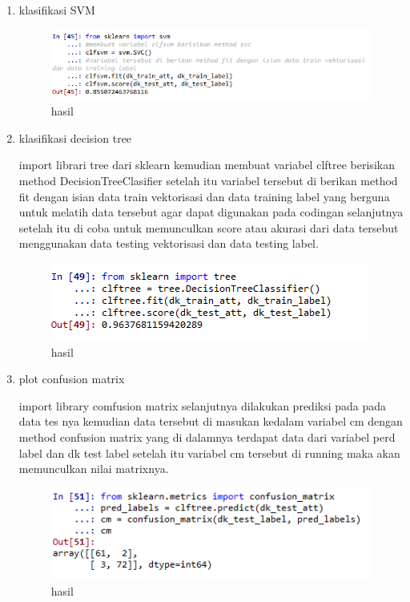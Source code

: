 \begin{enumerate}
\item klasifikasi SVM

\begin{figure}[H]
\centering
\includegraphics[scale=0.7]{figures/1174031/4/9.PNG}
\caption{hasil}
\label{Praktek no 4}
\end{figure}		

\item klasifikasi decision tree

\par import librari tree dari sklearn kemudian membuat variabel clftree berisikan method DecisionTreeClasifier setelah itu variabel tersebut di berikan method fit dengan isian data train vektorisasi dan data training label yang berguna untuk melatih data tersebut agar dapat digunakan pada codingan selanjutnya setelah itu di coba untuk memunculkan score atau akurasi dari data tersebut menggunakan data testing vektorisasi dan data testing label.
\begin{figure}[H]
\centering
\includegraphics[scale=0.7]{figures/1174031/4/10.PNG}
\caption{hasil}
\label{Praktek no 5}
\end{figure}	

\item plot confusion matrix

\par import library comfusion matrix selanjutnya dilakukan prediksi pada pada data tes nya kemudian data tersebut di masukan kedalam variabel cm dengan method confusion matrix yang di dalamnya terdapat data dari variabel perd label dan dk test label setelah itu variabel cm tersebut di running maka akan memunculkan nilai matrixnya. 	
\begin{figure}[H]
\centering
\includegraphics[scale=0.7]{figures/1174031/4/11.PNG}
\caption{hasil}
\label{Praktek no 6}
\end{figure}


\end{enumerate}
